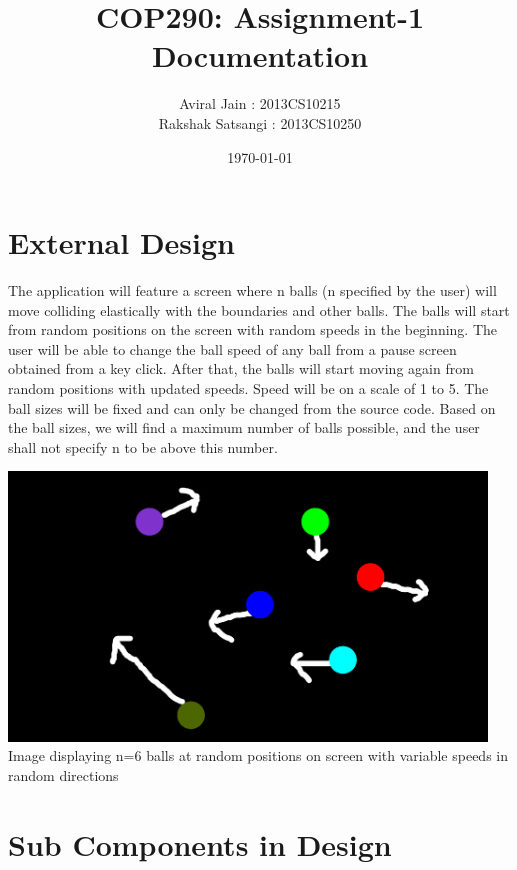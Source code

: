 \documentclass[10pt]{article}
\begin{document}
\title{COP290: Assignment-1 Documentation}
\author{Aviral Jain : 2013CS10215\\Rakshak Satsangi : 2013CS10250\\
}
\date{\today}
\maketitle

\hypersetup{
    colorlinks=true,
    linkcolor=blue,
    filecolor=magenta,      
    urlcolor=cyan,
}
\tableofcontents

\newpage 
\section{External Design}
	The application will feature a screen where n balls (n specified by the user) will move colliding elastically with the boundaries and other balls. The balls will start from random positions on the screen with random speeds in the beginning. The user will be able to change the ball speed of any ball from a pause screen obtained from a key click. After that, the balls will start moving again from random positions with updated speeds. Speed will be on a scale of 1 to 5. The ball sizes will be fixed and can only be changed from the source code. Based on the ball sizes, we will find a maximum number of balls possible, and the user shall not specify n to be above this number.
\begin{center}
\includegraphics[width = 5in]{screen.png}\\
\textsf{Image displaying n=6 balls at random positions on screen with variable speeds in random directions}
\end{center}

\section{Sub Components in Design}
\end{document}
